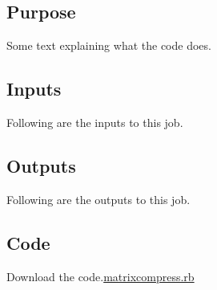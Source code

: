\documentclass[
  letterpaper,
  DIV=11,
  numbers=noendperiod]{scrreprt}
\begin{document}
\subsection{Purpose}

Some text explaining what the code does.

\subsection{Inputs}

Following are the inputs to this job.

\subsection{Outputs}

Following are the outputs to this job.

\subsection{Code}

Download the code.\href{../first.rb}{matrixcompress.rb}
\end{document}
